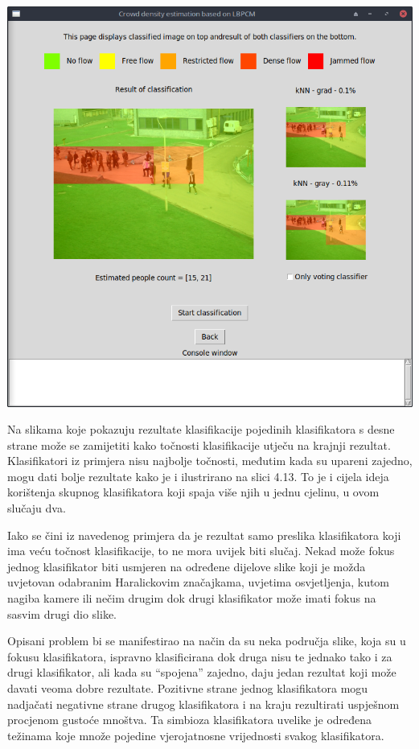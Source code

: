\documentclass[times, utf8, zavrsni]{fer}
\begin{document}
\begin{minipage}{\linewidth}
\centering
\includegraphics[scale=0.38]{img/cl5.png}
\end{minipage}

\bigbreak

Na slikama koje pokazuju rezultate klasifikacije pojedinih klasifikatora s 
desne strane može se zamijetiti kako točnosti klasifikacije utječu na
krajnji rezultat. Klasifikatori iz primjera nisu najbolje točnosti, 
međutim kada su upareni zajedno, mogu dati bolje rezultate kako je 
i ilustrirano na slici 4.13. To je i cijela ideja korištenja skupnog
klasifikatora koji spaja više njih u jednu cjelinu, u ovom slučaju
dva. 

\bigbreak

Iako se čini iz navedenog primjera da je rezultat samo preslika 
klasifikatora koji ima veću točnost klasifikacije, to ne mora uvijek 
biti slučaj. Nekad može fokus jednog klasifikator biti usmjeren 
na određene dijelove slike koji je možda uvjetovan odabranim 
Haralickovim značajkama, uvjetima osvjetljenja, kutom nagiba kamere ili 
nečim drugim dok drugi klasifikator može imati fokus na sasvim drugi 
dio slike. 

\bigbreak

Opisani problem bi se manifestirao na način da su neka 
područja slike, koja su u fokusu klasifikatora, ispravno klasificirana 
dok druga nisu te jednako tako i za drugi klasifikator, ali kada
su \enquote{spojena} zajedno, daju jedan rezultat koji može davati veoma
dobre rezultate. Pozitivne strane jednog klasifikatora mogu nadjačati 
negativne strane drugog klasifikatora i na kraju rezultirati uspješnom
procjenom gustoće mnoštva. Ta simbioza klasifikatora uvelike je određena 
težinama koje množe pojedine vjerojatnosne vrijednosti svakog klasifikatora.
\end{document}
